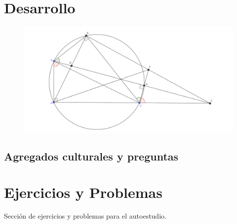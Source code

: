 \section{Desarrollo}

\begin{figure}[htb]
    \centering
    \includegraphics[width=\textwidth]{images/clase 1. problema 3.1}
\end{figure}

\subsection{Agregados culturales y preguntas}
{

}

\section{Ejercicios y Problemas}
{
    Sección de ejercicios y problemas para el autoestudio.
}